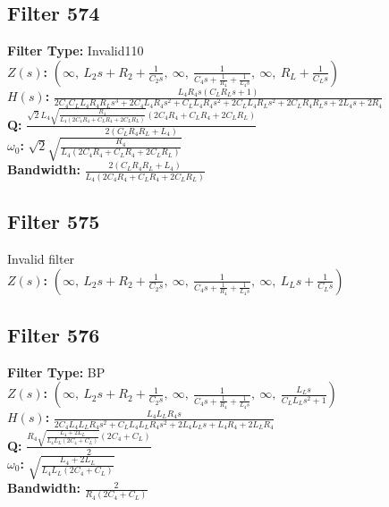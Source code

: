 \documentclass{article}
\begin{document}
\subsection*{Filter 574}
\textbf{Filter Type:} Invalid110 \\ 
\textbf{$Z(s)$:} $\left( \infty, \  L_{2} s + R_{2} + \frac{1}{C_{2} s}, \  \infty, \  \frac{1}{C_{4} s + \frac{1}{R_{4}} + \frac{1}{L_{4} s}}, \  \infty, \  R_{L} + \frac{1}{C_{L} s}\right)$ \\ 
\textbf{$H(s)$:} $\frac{L_{4} R_{4} s \left(C_{L} R_{L} s + 1\right)}{2 C_{4} C_{L} L_{4} R_{4} R_{L} s^{3} + 2 C_{4} L_{4} R_{4} s^{2} + C_{L} L_{4} R_{4} s^{2} + 2 C_{L} L_{4} R_{L} s^{2} + 2 C_{L} R_{4} R_{L} s + 2 L_{4} s + 2 R_{4}}$ \\ 
\textbf{Q:} $\frac{\sqrt{2} L_{4} \sqrt{\frac{R_{4}}{L_{4} \left(2 C_{4} R_{4} + C_{L} R_{4} + 2 C_{L} R_{L}\right)}} \left(2 C_{4} R_{4} + C_{L} R_{4} + 2 C_{L} R_{L}\right)}{2 \left(C_{L} R_{4} R_{L} + L_{4}\right)}$ \\ 
\textbf{$\omega_0$:} $\sqrt{2} \sqrt{\frac{R_{4}}{L_{4} \left(2 C_{4} R_{4} + C_{L} R_{4} + 2 C_{L} R_{L}\right)}}$ \\ 
\textbf{Bandwidth:} $\frac{2 \left(C_{L} R_{4} R_{L} + L_{4}\right)}{L_{4} \left(2 C_{4} R_{4} + C_{L} R_{4} + 2 C_{L} R_{L}\right)}$ \\ 
\subsection*{Filter 575}
Invalid filter \\ 
\textbf{$Z(s)$:} $\left( \infty, \  L_{2} s + R_{2} + \frac{1}{C_{2} s}, \  \infty, \  \frac{1}{C_{4} s + \frac{1}{R_{4}} + \frac{1}{L_{4} s}}, \  \infty, \  L_{L} s + \frac{1}{C_{L} s}\right)$ \\ 
\subsection*{Filter 576}
\textbf{Filter Type:} BP \\ 
\textbf{$Z(s)$:} $\left( \infty, \  L_{2} s + R_{2} + \frac{1}{C_{2} s}, \  \infty, \  \frac{1}{C_{4} s + \frac{1}{R_{4}} + \frac{1}{L_{4} s}}, \  \infty, \  \frac{L_{L} s}{C_{L} L_{L} s^{2} + 1}\right)$ \\ 
\textbf{$H(s)$:} $\frac{L_{4} L_{L} R_{4} s}{2 C_{4} L_{4} L_{L} R_{4} s^{2} + C_{L} L_{4} L_{L} R_{4} s^{2} + 2 L_{4} L_{L} s + L_{4} R_{4} + 2 L_{L} R_{4}}$ \\ 
\textbf{Q:} $\frac{R_{4} \sqrt{\frac{L_{4} + 2 L_{L}}{L_{4} L_{L} \left(2 C_{4} + C_{L}\right)}} \left(2 C_{4} + C_{L}\right)}{2}$ \\ 
\textbf{$\omega_0$:} $\sqrt{\frac{L_{4} + 2 L_{L}}{L_{4} L_{L} \left(2 C_{4} + C_{L}\right)}}$ \\ 
\textbf{Bandwidth:} $\frac{2}{R_{4} \left(2 C_{4} + C_{L}\right)}$ \\ 
\end{document}
